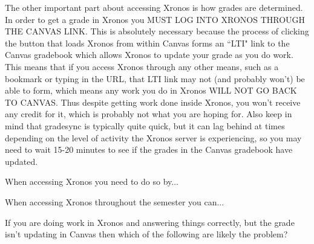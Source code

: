 \documentclass{ximeraXloud}
\begin{document}
The other important part about accessing Xronos is how grades are determined. In order to get a grade in Xronos you MUST LOG INTO XRONOS THROUGH THE CANVAS LINK. This is absolutely necessary because the process of clicking the button that loads Xronos from within Canvas forms an ``LTI" link to the Canvas gradebook which allows Xronos to update your grade as you do work. This means that if you access Xronos through any other means, such as a bookmark or typing in the URL, that LTI link may not (and probably won't) be able to form, which means any work you do in Xronos WILL NOT GO BACK TO CANVAS. Thus despite getting work done inside Xronos, you won't receive any credit for it, which is probably not what you are hoping for. Also keep in mind that gradesync is typically quite quick, but it can lag behind at times depending on the level of activity the Xronos server is experiencing, so you may need to wait 15-20 minutes to see if the grades in the Canvas gradebook have updated.

\begin{problem}
    When accessing Xronos you need to do so by...
    \begin{selectAll}
    \end{selectAll}
    \begin{problem}
        When accessing Xronos throughout the semester you can...
        \begin{selectAll}
        \end{selectAll}
    \end{problem}
\end{problem}

\begin{problem}
    If you are doing work in Xronos and answering things correctly, but the grade isn't updating in Canvas then which of the following are likely the problem?
    \begin{selectAll}
    \end{selectAll}
\end{problem}
\end{document}
